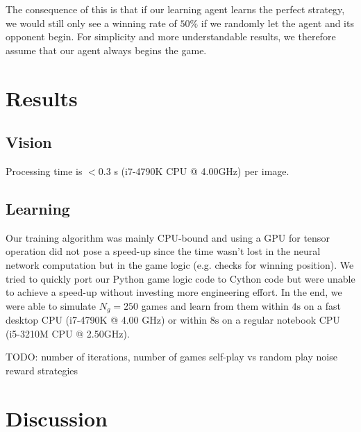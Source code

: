 \documentclass[10pt,twocolumn,letterpaper]{article}
\begin{document}
The consequence of this is that if our learning agent learns the perfect strategy, we would still only see a winning rate of $50\%$ if we randomly
let the agent and its opponent begin.
For simplicity and more understandable results, we therefore assume that our agent always begins the game.

\section{Results}

\subsection{Vision}
Processing time is $< 0.3$ s (i7-4790K CPU @ 4.00GHz) per image.

\subsection{Learning}
Our training algorithm was mainly CPU-bound and using a GPU for tensor
operation did not pose a speed-up since the time wasn't lost in the neural
network computation but in the game logic (e.g. checks for winning position).
We tried to quickly port our Python game logic code to Cython code but were
unable to achieve a speed-up without investing more engineering effort.
In the end, we were able to simulate $N_g = 250$ games and learn from
them within $4\mathrm{s}$ on a fast desktop CPU (i7-4790K @ 4.00 GHz)
or within $8 \mathrm{s}$ on a regular notebook CPU (i5-3210M CPU @ 2.50GHz).

TODO:
number of iterations, number of games
self-play vs random play
noise
reward strategies
\section{Discussion}

{\small
\printbibliography
}
\end{document}
